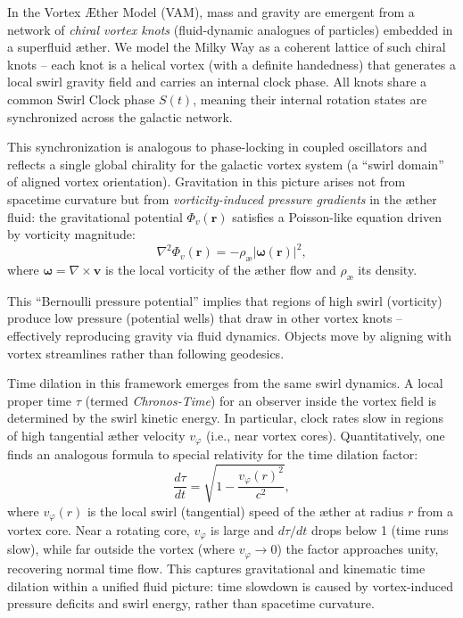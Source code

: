 \documentclass[11pt]{article}
\begin{document}
In the Vortex \AE ther Model (VAM), mass and gravity are emergent from a network of \emph{chiral vortex knots} (fluid-dynamic analogues of particles) embedded in a superfluid \ae ther. We model the Milky Way as a coherent lattice of such chiral knots -- each knot is a helical vortex (with a definite handedness) that generates a local swirl gravity field and carries an internal clock phase. All knots share a common Swirl Clock phase $S(t)$, meaning their internal rotation states are synchronized across the galactic network\cite{iskandarani2025vam2}.

This synchronization is analogous to phase-locking in coupled oscillators and reflects a single global chirality for the galactic vortex system (a ``swirl domain'' of aligned vortex orientation). Gravitation in this picture arises not from spacetime curvature but from \emph{vorticity-induced pressure gradients} in the \ae ther fluid: the gravitational potential $\Phi_v(\mathbf{r})$ satisfies a Poisson-like equation driven by vorticity magnitude\cite{iskandarani2025vam2}:
\begin{equation}
\nabla^2 \Phi_v(\mathbf{r}) = -\rho_{\text{\ae}} |\boldsymbol{\omega}(\mathbf{r})|^2,
\label{eq:swirl-grav}
\end{equation}
where $\boldsymbol{\omega}=\nabla\times \mathbf{v}$ is the local vorticity of the \ae ther flow and $\rho_{\text{\ae}}$ its density\cite{iskandarani2025vam2}.

This ``Bernoulli pressure potential'' implies that regions of high swirl (vorticity) produce low pressure (potential wells) that draw in other vortex knots -- effectively reproducing gravity via fluid dynamics. Objects move by aligning with vortex streamlines rather than following geodesics\cite{iskandarani2025vam2}.

Time dilation in this framework emerges from the same swirl dynamics. A local proper time $\tau$ (termed \emph{Chronos-Time}) for an observer inside the vortex field is determined by the swirl kinetic energy. In particular, clock rates slow in regions of high tangential \ae ther velocity $v_{\varphi}$ (i.e., near vortex cores). Quantitatively, one finds an analogous formula to special relativity for the time dilation factor:
\begin{equation}
\frac{d\tau}{dt} = \sqrt{1 - \frac{v_{\varphi}(r)^2}{c^2}},
\label{eq:swirl-time}
\end{equation}
where $v_{\varphi}(r)$ is the local swirl (tangential) speed of the \ae ther at radius $r$ from a vortex core. Near a rotating core, $v_{\varphi}$ is large and $d\tau/dt$ drops below 1 (time runs slow), while far outside the vortex (where $v_{\varphi}\to 0$) the factor approaches unity, recovering normal time flow. This captures gravitational and kinematic time dilation within a unified fluid picture: time slowdown is caused by vortex-induced pressure deficits and swirl energy, rather than spacetime curvature\cite{iskandarani2025vam2}.
\end{document}
